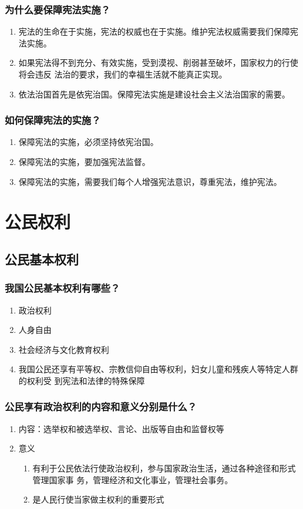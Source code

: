 \documentclass[11pt]{article}
\begin{document}
\subsubsection{为什么要保障宪法实施？}
\label{sec:org356a2ed}
\begin{enumerate}
\item 宪法的生命在于实施，宪法的权威也在于实施。维护宪法权威需要我们保障宪法实施。
\item 如果宪法得不到充分、有效实施，受到漠视、削弱甚至破坏，国家权力的行使将会违反
法治的要求，我们的幸福生活就不能真正实现。
\item 依法治国首先是依宪治国。保障宪法实施是建设社会主义法治国家的需要。
\end{enumerate}
\subsubsection{如何保障宪法的实施？}
\label{sec:orge4918a8}
\begin{enumerate}
\item 保障宪法的实施，必须坚持依宪治国。
\item 保障宪法的实施，要加强宪法监督。
\item 保障宪法的实施，需要我们每个人增强宪法意识，尊重宪法，维护宪法。
\end{enumerate}
\section{公民权利}
\label{sec:orgd186298}
\subsection{公民基本权利}
\label{sec:orgf54e3b7}
\subsubsection{我国公民基本权利有哪些？}
\label{sec:org31dfae7}
\begin{enumerate}
\item 政治权利
\item 人身自由
\item 社会经济与文化教育权利
\item 我国公民还享有平等权、宗教信仰自由等权利，妇女儿童和残疾人等特定人群的权利受
到宪法和法律的特殊保障
\end{enumerate}
\subsubsection{公民享有政治权利的内容和意义分别是什么？}
\label{sec:org5bf4d10}
\begin{enumerate}
\item 内容：选举权和被选举权、言论、出版等自由和监督权等
\item 意义
\begin{enumerate}
\item 有利于公民依法行使政治权利，参与国家政治生活，通过各种途径和形式管理国家事
务，管理经济和文化事业，管理社会事务。
\item 是人民行使当家做主权利的重要形式
\end{enumerate}
\end{enumerate}
\end{document}
